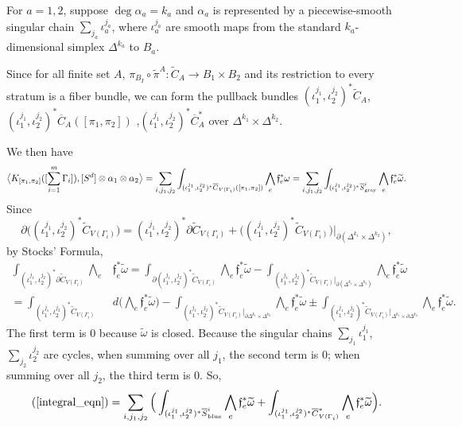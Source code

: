 \documentclass[11pt]{article}
\theoremstyle{definition}
\theoremstyle{remark}
\def\wt#1{\widetilde{#1}}
\def\ov#1{\overline{#1}}
\def\sgray{{\textnormal{gray}}}
\def\sblue{{\textnormal{blue}}}
\def\ff{\mathfrak{f}}
\begin{document}
For $a=1,2$, suppose $\deg\alpha_a=k_a$ and $\alpha_a$ is represented by a piecewise-smooth singular chain $\sum_{j_a}\iota^{j_a}_a$, 
where $\iota^{j_a}_a$ are smooth maps from the standard $k_a$-dimensional simplex $\Delta^{k_a}$ to $B_a$. 

Since for all finite set $A$,
$\pi_{B_I}\circ\tilde{\pi}^A:\wt{C}_A\to B_1\times B_2$
and its restriction to every stratum is a fiber bundle, 
we can form the pullback bundles $(\iota_1^{j_1},\iota_2^{j_2})^*\wt{C}_A$, $(\iota_1^{j_1},\iota_2^{j_2})^*\ov{C}_A([\pi_1,\pi_2])$ ,$(\iota_1^{j_1},\iota_2^{j_2})^*\ov{C}^*_A$ over $\Delta^{k_1}\times\Delta^{k_2}$.  

We then have 
\begin{equation}
\label{integral_eqn}
\big\langle K_{[\pi_1,\pi_2]}([\sum_{i=1}^m\Gamma_i]), [S^d]\otimes\alpha_1\otimes\alpha_2 \big\rangle=
\sum_{i,j_1,j_2}\int_{(\iota_1^{j_1},\iota_2^{j_2})^*\ov{C}_{V(\Gamma_i)}([\pi_1,\pi_2])}\bigwedge_{e}\ff_e^*{\omega}=
\sum_{i,j_1,j_2}\int_{(\iota_1^{j_1},\iota_2^{j_2})^*\ov{S}_{\sgray}^i}\bigwedge_{e}\ff_e^*\wt{\omega}.
\end{equation}
Since 
\[
\partial\big((\iota_1^{j_1},\iota_2^{j_2})^*\wt{C}_{V(\Gamma_i)}\big)=(\iota_1^{j_1},\iota_2^{j_2})^*\partial\wt{C}_{V(\Gamma_i)}+\big((\iota_1^{j_1},\iota_2^{j_2})^*\wt{C}_{V(\Gamma_i)}\big)\big|_{\partial(\Delta^{k_1}\times\Delta^{k_2})}, 
\]
by Stocks' Formula, 
\begin{align*}
\int_{(\iota_1^{j_1},\iota_2^{j_2})^*\partial\wt{C}_{V(\Gamma_i)}}\bigwedge_{e}&\ff_e^*\wt{\omega}=
\int_{\partial(\iota_1^{j_1},\iota_2^{j_2})^*\wt{C}_{V(\Gamma_i)}}\bigwedge_{e}\ff_e^*\wt{\omega}-
\int_{(\iota_1^{j_1},\iota_2^{j_2})^*\wt{C}_{V(\Gamma_i)}|_{\partial(\Delta^{k_1}\times\Delta^{k_2})}}\bigwedge_{e}\ff_e^*\wt{\omega}\\
=\int_{(\iota_1^{j_1},\iota_2^{j_2})^*\wt{C}_{V(\Gamma_i)}}&d\Big(\bigwedge_{e}\ff_e^*\wt{\omega}\Big)-
\int_{(\iota_1^{j_1},\iota_2^{j_2})^*\wt{C}_{V(\Gamma_i)}|_{\partial\Delta^{k_1}\times\Delta^{k_2}}}\bigwedge_{e}\ff_e^*\wt{\omega}\pm
\int_{(\iota_1^{j_1},\iota_2^{j_2})^*\wt{C}_{V(\Gamma_i)}|_{\Delta^{k_1}\times\partial\Delta^{k_2}}}\bigwedge_{e}\ff_e^*\wt{\omega}.
\end{align*}
The first term is 0 because $\wt{\omega}$ is closed.  
Because the singular chains $\sum_{j_1}\iota_1^{j_1}$, $\sum_{j_2}\iota_2^{j_2}$ are cycles, when summing over all $j_1$, the second term is 0; when summing over all $j_2$, the third term is 0. 
So, 
$$(\ref{integral_eqn})=\sum_{i,j_1,j_2}\Big(\int_{(\iota_1^{j_1},\iota_2^{j_2})^*\ov{S}_{\sblue}^i}\bigwedge_{e}\ff_e^*\wt{\omega}+\int_{(\iota_1^{j_1},\iota_2^{j_2})^*\ov{C}^*_{V(\Gamma_i)}}\bigwedge_{e}\ff_e^*{\wt\omega}\Big).$$
\end{document}
